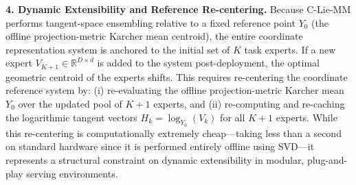 \textbf{4. Dynamic Extensibility and Reference Re-centering.}
Because C-Lie-MM performs tangent-space ensembling relative to a fixed reference point $Y_0$ (the offline projection-metric Karcher mean centroid), the entire coordinate representation system is anchored to the initial set of $K$ task experts. If a new expert $V_{K+1} \in \mathbb{R}^{D \times d}$ is added to the system post-deployment, the optimal geometric centroid of the experts shifts. This requires re-centering the coordinate reference system by: (i) re-evaluating the offline projection-metric Karcher mean $Y_0$ over the updated pool of $K+1$ experts, and (ii) re-computing and re-caching the logarithmic tangent vectors $H_k = \log_{Y_0}(V_k)$ for all $K+1$ experts. While this re-centering is computationally extremely cheap---taking less than a second on standard hardware since it is performed entirely offline using SVD---it represents a structural constraint on dynamic extensibility in modular, plug-and-play serving environments.

